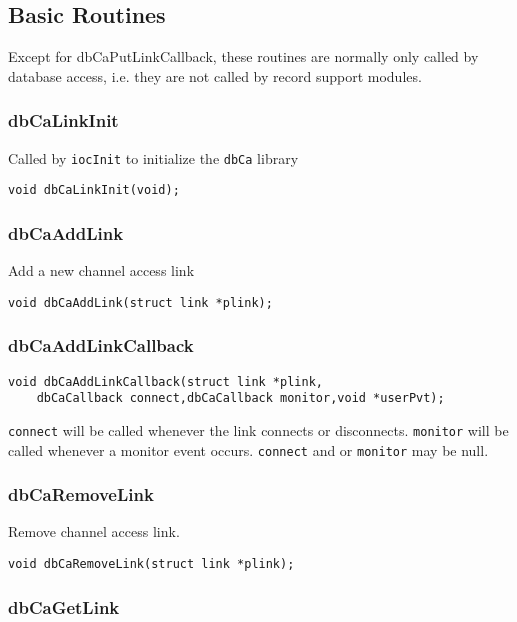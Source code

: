 \subsection{Basic Routines}

Except for dbCaPutLinkCallback, these routines are normally only called by database access, i.e. they are not called by 
record support modules.

\subsubsection{dbCaLinkInit}

Called by \verb|iocInit| to initialize the \verb|dbCa| library

\begin{verbatim}void dbCaLinkInit(void);
\end{verbatim}\subsubsection{dbCaAddLink}

Add a new channel access link

\begin{verbatim}void dbCaAddLink(struct link *plink);
\end{verbatim}\subsubsection{dbCaAddLinkCallback}

\begin{verbatim}void dbCaAddLinkCallback(struct link *plink,
    dbCaCallback connect,dbCaCallback monitor,void *userPvt);
\end{verbatim}\verb|connect| will be called whenever the link connects or disconnects. \verb|monitor| will be called whenever a monitor event 
occurs. \verb|connect| and or \verb|monitor| may be null.

\subsubsection{dbCaRemoveLink}

Remove channel access link.

\begin{verbatim}void dbCaRemoveLink(struct link *plink);
\end{verbatim}\subsubsection{dbCaGetLink}

